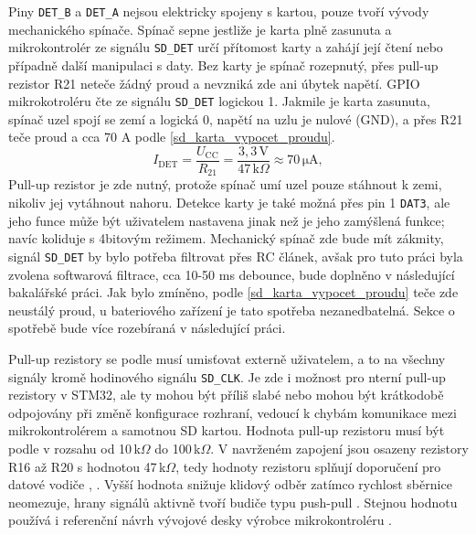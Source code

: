 Piny \texttt{DET\_B}  a \texttt{DET\_A} nejsou elektricky spojeny s kartou, pouze tvoří vývody mechanického spínače. Spínač sepne jestliže je karta plně zasunuta a mikrokontrolér ze signálu \texttt{SD\_DET} určí přítomost karty a zahájí její čtení nebo případně další manipulaci s daty. Bez karty je spínač rozepnutý, přes pull-up rezistor R21 neteče žádný proud a nevzniká zde ani úbytek napětí. GPIO mikrokotroléru čte ze signálu \texttt{SD\_DET} logickou 1. Jakmile je karta zasunuta, spínač uzel spojí se zemí a logická 0, napětí na uzlu je nulové (GND), a přes R21 teče proud a cca 70 \textmu A podle \ref{sd_karta_vypocet_proudu}. 
\begin{equation}
    I_{\mathrm{DET}} = \frac{U_{\mathrm{CC}}}{R_{21}}
    = \frac{3{,}3\,\mathrm{V}}{47\,\mathrm{k}\Omega}
    \approx 70\,\mathrm{\mu A},
    \label{sd_karta_vypocet_proudu}
\end{equation}
Pull-up rezistor je zde nutný, protože spínač umí uzel pouze stáhnout k zemi, nikoliv jej vytáhnout nahoru. Detekce karty je také možná přes pin 1 \texttt{DAT3}, ale jeho funce může být uživatelem nastavena jinak než je jeho zamýšlená funkce; navíc koliduje s 4bitovým režimem. Mechanický spínač zde bude mít zákmity, signál \texttt{SD\_DET} by bylo potřeba filtrovat přes RC článek, avšak pro tuto práci byla zvolena softwarová filtrace, cca 10-50 ms debounce, bude doplněno v následující bakalářské práci. Jak bylo zmíněno, podle \ref{sd_karta_vypocet_proudu} teče zde neustálý proud, u bateriového zařízení je tato spotřeba nezanedbatelná. Sekce o spotřebě bude více rozebíraná v následující práci.

Pull-up rezistory se podle \cite{manual_sandisk_microsd} musí umisťovat externě uživatelem, a to na všechny signály kromě hodinového signálu \texttt{SD\_CLK}. Je zde i možnost pro nterní pull-up rezistory v STM32, ale ty mohou být příliš slabé nebo mohou být krátkodobě odpojovány při změně konfigurace rozhraní, vedoucí k chybám komunikace mezi mikrokontrolérem a samotnou SD kartou. Hodnota pull-up rezistoru musí být podle \cite[s.~4]{an2111_swissbit} v  rozsahu od 10\,k$\Omega$ do 100\,k$\Omega$. V navrženém zapojení jsou osazeny rezistory R16 až R20 s hodnotou 47\,k$\Omega$, tedy hodnoty rezistoru splňují doporučení pro datové vodiče \cite[s.~4]{an2111_swissbit}, \cite[s.~3-8, tab.~3-5]{manual_sandisk_sd}. Vyšší hodnota snižuje klidový odběr zatímco rychlost sběrnice neomezuje, hrany signálů aktivně tvoří budiče typu push-pull \cite[s.~15]{manual_sandisk_microsd}. Stejnou hodnotu používá i referenční návrh vývojové desky výrobce mikrokontroléru \cite[s.~44, obr.~28]{um2411_st}.

